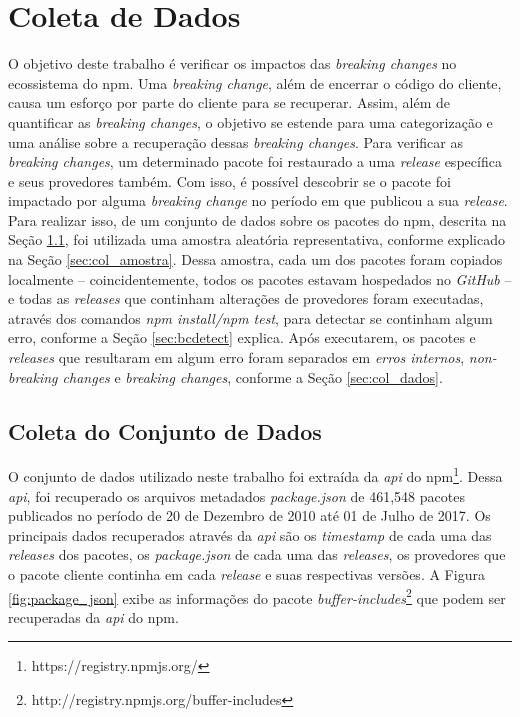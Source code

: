 \chapter{Coleta de Dados}
\label{cap:metodologia}

O objetivo deste trabalho é verificar os impactos das \textit{breaking changes} no ecossistema do \gls{npm}. Uma \textit{breaking change}, além de encerrar o código do cliente, causa um esforço por parte do cliente para se recuperar. Assim, além de quantificar as \textit{breaking changes}, o objetivo se estende para uma categorização e uma análise sobre a recuperação dessas \textit{breaking changes}. Para verificar as \textit{breaking changes}, um determinado pacote foi restaurado a uma \textit{release} específica e seus provedores também. Com isso, é possível descobrir se o pacote foi impactado por alguma \textit{breaking change} no período em que publicou a sua \textit{release}. Para realizar isso, de um conjunto de dados sobre os pacotes do \gls{npm}, descrita na Seção \ref{sec:col_base}, foi utilizada uma amostra aleatória representativa, conforme explicado na Seção \ref{sec:col_amostra}. Dessa amostra, cada um dos pacotes foram copiados localmente -- coincidentemente, todos os pacotes estavam hospedados no \textit{GitHub} -- e todas as \textit{releases} que continham alterações de provedores foram executadas, através dos comandos \textit{npm install/npm test}, para detectar se continham algum erro, conforme a Seção \ref{sec:bcdetect} explica. Após executarem, os pacotes e \textit{releases} que resultaram em algum erro foram separados em \textit{erros internos}, \textit{non-breaking changes} e \textit{breaking changes}, conforme a Seção \ref{sec:col_dados}.

\section{Coleta do Conjunto de Dados}
\label{sec:col_base}
O conjunto de dados utilizado neste trabalho foi extraída da \textit{api} do \gls{npm}\footnote{https://registry.npmjs.org/}. Dessa \textit{api}, foi recuperado os arquivos metadados \textit{package.json} de 461,548 pacotes publicados no período de 20 de Dezembro de 2010 até 01 de Julho de 2017. Os principais dados recuperados através da \textit{api} são os \textit{timestamp} de cada uma das \textit{releases} dos pacotes, os \textit{package.json} de cada uma das \textit{releases}, os provedores que o pacote cliente continha em cada \textit{release} e suas respectivas versões. A Figura \ref{fig:package_json} exibe as informações do pacote \textit{buffer-includes}\footnote{http://registry.npmjs.org/buffer-includes} que podem ser recuperadas da \textit{api} do \gls{npm}.

